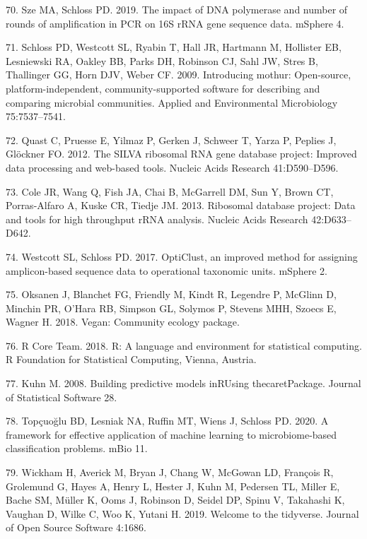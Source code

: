 \documentclass[
  11pt,
]{article}
\begin{document}
\leavevmode\hypertarget{ref-Sze2019}{}%
70. Sze MA, Schloss PD. 2019. The impact of DNA polymerase and number of
rounds of amplification in PCR on 16S rRNA gene sequence data. mSphere
4.

\leavevmode\hypertarget{ref-Schloss2009}{}%
71. Schloss PD, Westcott SL, Ryabin T, Hall JR, Hartmann M, Hollister
EB, Lesniewski RA, Oakley BB, Parks DH, Robinson CJ, Sahl JW, Stres B,
Thallinger GG, Horn DJV, Weber CF. 2009. Introducing mothur:
Open-source, platform-independent, community-supported software for
describing and comparing microbial communities. Applied and
Environmental Microbiology 75:7537--7541.

\leavevmode\hypertarget{ref-Quast2012}{}%
72. Quast C, Pruesse E, Yilmaz P, Gerken J, Schweer T, Yarza P, Peplies
J, Glöckner FO. 2012. The SILVA ribosomal RNA gene database project:
Improved data processing and web-based tools. Nucleic Acids Research
41:D590--D596.

\leavevmode\hypertarget{ref-Cole2013}{}%
73. Cole JR, Wang Q, Fish JA, Chai B, McGarrell DM, Sun Y, Brown CT,
Porras-Alfaro A, Kuske CR, Tiedje JM. 2013. Ribosomal database project:
Data and tools for high throughput rRNA analysis. Nucleic Acids Research
42:D633--D642.

\leavevmode\hypertarget{ref-Westcott2017}{}%
74. Westcott SL, Schloss PD. 2017. OptiClust, an improved method for
assigning amplicon-based sequence data to operational taxonomic units.
mSphere 2.

\leavevmode\hypertarget{ref-Vegan2018}{}%
75. Oksanen J, Blanchet FG, Friendly M, Kindt R, Legendre P, McGlinn D,
Minchin PR, O'Hara RB, Simpson GL, Solymos P, Stevens MHH, Szoecs E,
Wagner H. 2018. Vegan: Community ecology package.

\leavevmode\hypertarget{ref-r_citation_2018}{}%
76. R Core Team. 2018. R: A language and environment for statistical
computing. R Foundation for Statistical Computing, Vienna, Austria.

\leavevmode\hypertarget{ref-Kuhn2008}{}%
77. Kuhn M. 2008. Building predictive models inRUsing thecaretPackage.
Journal of Statistical Software 28.

\leavevmode\hypertarget{ref-Topcuoglu2020}{}%
78. Topçuoğlu BD, Lesniak NA, Ruffin MT, Wiens J, Schloss PD. 2020. A
framework for effective application of machine learning to
microbiome-based classification problems. mBio 11.

\leavevmode\hypertarget{ref-Tidyverse2019}{}%
79. Wickham H, Averick M, Bryan J, Chang W, McGowan LD, François R,
Grolemund G, Hayes A, Henry L, Hester J, Kuhn M, Pedersen TL, Miller E,
Bache SM, Müller K, Ooms J, Robinson D, Seidel DP, Spinu V, Takahashi K,
Vaughan D, Wilke C, Woo K, Yutani H. 2019. Welcome to the tidyverse.
Journal of Open Source Software 4:1686.
\end{document}
